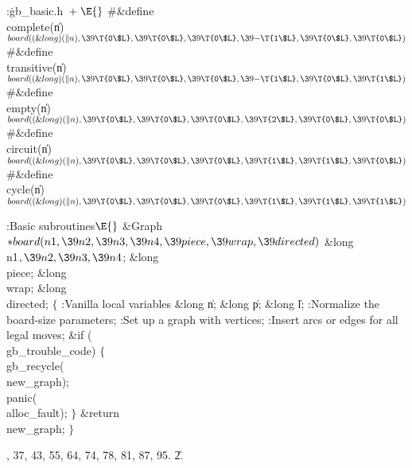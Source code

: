 \Y\B\4:\.{gb\_basic.h\,}\X${}\mathrel+\E{}$\6
\8\#\&{define} \\{complete}(\|n)\5${}\\{board}((\&{long})(\|n),\39\T{0\$L},\39%
\T{0\$L},\39\T{0\$L},\39{-}\T{1\$L},\39\T{0\$L},\39\T{0\$L}){}$\6
\8\#\&{define} \\{transitive}(\|n)\5${}\\{board}((\&{long})(\|n),\39\T{0\$L},%
\39\T{0\$L},\39\T{0\$L},\39{-}\T{1\$L},\39\T{0\$L},\39\T{1\$L}){}$\6
\8\#\&{define} \\{empty}(\|n)\5${}\\{board}((\&{long})(\|n),\39\T{0\$L},\39\T{0%
\$L},\39\T{0\$L},\39\T{2\$L},\39\T{0\$L},\39\T{0\$L}){}$\6
\8\#\&{define} \\{circuit}(\|n)\5${}\\{board}((\&{long})(\|n),\39\T{0\$L},\39%
\T{0\$L},\39\T{0\$L},\39\T{1\$L},\39\T{1\$L},\39\T{0\$L}){}$\6
\8\#\&{define} \\{cycle}(\|n)\5${}\\{board}((\&{long})(\|n),\39\T{0\$L},\39\T{0%
\$L},\39\T{0\$L},\39\T{1\$L},\39\T{1\$L},\39\T{1\$L}){}$\par
\fi

\B{}:Basic subroutines\X${}\E{}$\6
\1\1\&{Graph} ${}{*}\\{board}(\\{n1},\39\\{n2},\39\\{n3},\39\\{n4},\39%
\\{piece},\39\\{wrap},\39\\{directed}){}$\6
\&{long} \\{n1}${},\39\\{n2},\39\\{n3},\39\\{n4}{}$;%
\6
\&{long} \\{piece};\6
\&{long} \\{wrap};\6
\&{long} \\{directed};\2\2\6
${}\{{}$\5
\1:Vanilla local variables\X\5
\hbox{}\6{}\&{long} \|n;\6
\&{long} \|p;\6
\&{long} \|l;\7
:Normalize the board-size parameters\X;\6
:Set up a graph with  vertices\X;\6
:Insert arcs or edges for all legal moves\X;\6
\&{if} (\\{gb\_trouble\_code})\5
${}\{{}$\1\6
\\{gb\_recycle}(\\{new\_graph});\6
\\{panic}(\\{alloc\_fault});\6
\4${}\}{}$\2\6
\&{return} \\{new\_graph};\6
\4${}\}{}$\2\par
{}, 37, 43, 55, 64, 74, 78, 81, 87, 95.
\U2.\fi

